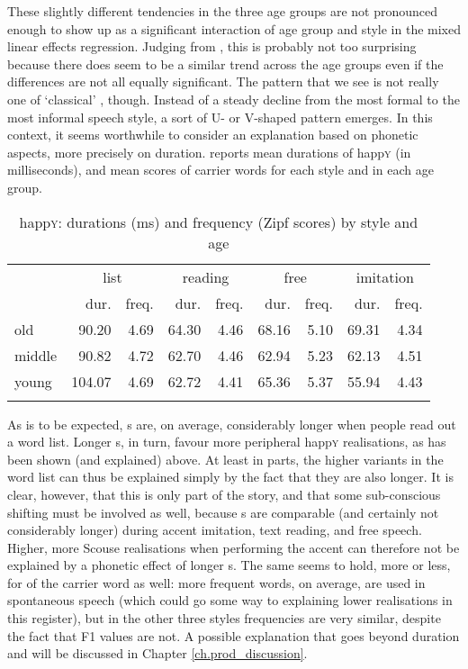 These slightly different tendencies in the three age groups are not pronounced enough to show up as a significant interaction of age group and style in the mixed linear effects regression.
Judging from , this is probably not too surprising because there does seem to be a similar trend across the age groups even if the differences are not all equally significant.
The pattern that we see is not really one of `classical' , though.
Instead of a steady decline from the most formal to the most informal speech style, a sort of U- or V-shaped pattern emerges.
In this context, it seems worthwhile to consider an explanation based on phonetic aspects, more precisely on duration.
 reports mean durations of happ\textsc{y} (in milliseconds), and mean  scores of carrier words for each style and in each age group.

\begin{table}
	
	\caption{happ\textsc{y}: durations (ms) and frequency (Zipf scores) by style and age}
	\label{tab.dur.style.happy}
	\begin{tabular}{lrrrrrrrr}
		\lsptoprule
		& \multicolumn{2}{c}{list} & \multicolumn{2}{c}{reading} & \multicolumn{2}{c}{free} & \multicolumn{2}{c}{imitation\is{accent performance}}\\
		& dur. & freq. & dur. & freq. & dur. & freq. & dur. & freq.\\
		\midrule
		old & 90.20 & 4.69 & 64.30 & 4.46 & 68.16 & 5.10 & 69.31 & 4.34\\
		middle & 90.82 & 4.72 & 62.70 & 4.46 & 62.94 & 5.23 & 62.13 & 4.51\\
		young & 104.07 & 4.69 & 62.72 & 4.41 & 65.36 & 5.37 & 55.94 & 4.43\\
		\lspbottomrule
	\end{tabular}
\end{table}

As is to be expected, s are, on average, considerably longer when people read out a word list.
Longer s, in turn, favour more peripheral happ\textsc{y} realisations, as has been shown (and explained) above.
At least in parts, the higher variants in the word list can thus be explained simply by the fact that they are also longer.
It is clear, however, that this is only part of the story, and that some sub-conscious shifting must be involved as well, because s are comparable (and certainly not considerably longer) during accent imitation, text reading, and free speech.
Higher, more Scouse realisations when performing the accent can therefore not be explained by a phonetic effect of longer s.
The same seems to hold, more or less, for  of the carrier word as well: more frequent words, on average, are used in spontaneous speech (which could go some way to explaining lower realisations in this register), but in the other three styles frequencies are very similar, despite the fact that F1 values are not.
A possible explanation that goes beyond duration and  will be discussed in Chapter \ref{ch.prod_discussion}.

